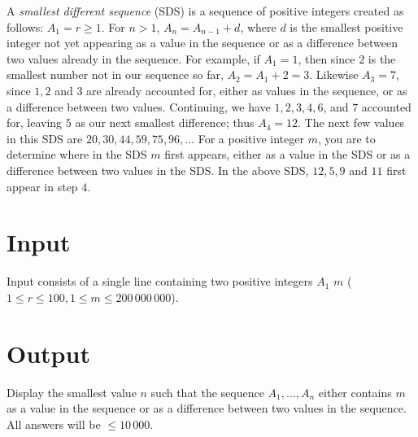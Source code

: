 A {\em smallest different sequence\/} (SDS) is a sequence of positive integers created as follows: $A_1=r \geq 1$. For $n>1$, $A_n=A_{n-1}+d$, where $d$ is the smallest positive integer not yet appearing as a value in the sequence or as a difference between two values already in the sequence. For example, if $A_1 =1$, then since $2$ is the smallest number not in our sequence so far, $A_2=A_1+2=3$. Likewise $A_3=7$, since $1, 2$ and $3$ are already accounted for, either as values in the sequence, or as a difference between two values. Continuing, we have $1, 2, 3, 4, 6$, and $7$ accounted for, leaving $5$ as our next smallest difference; thus $A_4=12$. The next few values in this SDS are $20, 30, 44, 59, 75, 96, \ldots$ For a positive integer $m$, you are to determine where in the SDS $m$ first appears, either as a value in the SDS or as a difference between two values in the SDS. In the above SDS, $12, 5, 9$ and $11$ first appear in step $4$.


\section*{Input}
Input consists of a single line containing two positive integers $A_1$ $m$ ($1 \leq r \leq 100, 1 \leq m \leq 200\,000\,000$).

\section*{Output}
Display the smallest value $n$ such that the sequence $A_1, \ldots, A_n$ either contains $m$ as a value in the sequence or as a difference between two values in the sequence.  All answers will be $\leq 10\,000$.